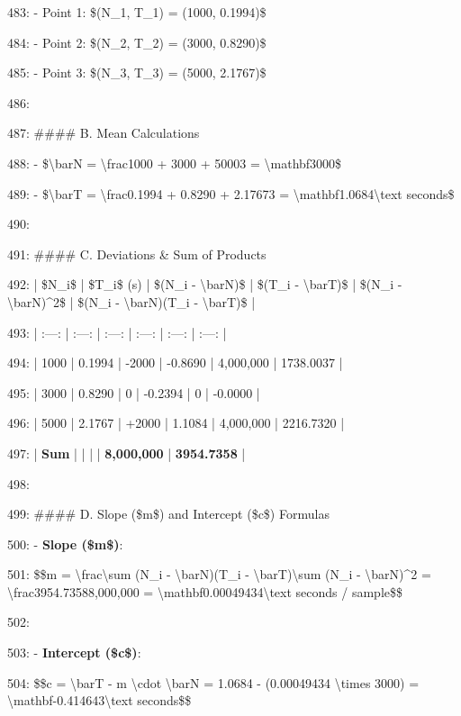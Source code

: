 \documentclass[11pt,a4paper]{article}
\begin{document}
483: - Point 1: \$(N\_1, T\_1) = (1000, 0.1994)\$

484: - Point 2: \$(N\_2, T\_2) = (3000, 0.8290)\$

485: - Point 3: \$(N\_3, T\_3) = (5000, 2.1767)\$

486:

487: \#\#\#\# B. Mean Calculations

488: - \$\textbackslash{}bar{N} = \textbackslash{}frac{1000 + 3000 + 5000}{3} = \textbackslash{}mathbf{3000}\$

489: - \$\textbackslash{}bar{T} = \textbackslash{}frac{0.1994 + 0.8290 + 2.1767}{3} = \textbackslash{}mathbf{1.0684\textbackslash{}text{ seconds}}\$

490:

491: \#\#\#\# C. Deviations \& Sum of Products

492: | \$N\_i\$ | \$T\_i\$ (s) | \$(N\_i - \textbackslash{}bar{N})\$ | \$(T\_i - \textbackslash{}bar{T})\$ | \$(N\_i - \textbackslash{}bar{N})\textasciicircum{}2\$ | \$(N\_i - \textbackslash{}bar{N})(T\_i - \textbackslash{}bar{T})\$ |

493: | :---: | :---: | :---: | :---: | :---: | :---: |

494: | 1000 | 0.1994 | -2000 | -0.8690 | 4,000,000 | 1738.0037 |

495: | 3000 | 0.8290 | 0 | -0.2394 | 0 | -0.0000 |

496: | 5000 | 2.1767 | +2000 | 1.1084 | 4,000,000 | 2216.7320 |

497: | \textbf{Sum} | | | | \textbf{8,000,000} | \textbf{3954.7358} |

498:

499: \#\#\#\# D. Slope (\$m\$) and Intercept (\$c\$) Formulas

500: - \textbf{Slope (\$m\$)}:

501:   \$\$m = \textbackslash{}frac{\textbackslash{}sum (N\_i - \textbackslash{}bar{N})(T\_i - \textbackslash{}bar{T})}{\textbackslash{}sum (N\_i - \textbackslash{}bar{N})\textasciicircum{}2} = \textbackslash{}frac{3954.7358}{8,000,000} = \textbackslash{}mathbf{0.00049434\textbackslash{}text{ seconds / sample}}\$\$

502:

503: - \textbf{Intercept (\$c\$)}:

504:   \$\$c = \textbackslash{}bar{T} - m \textbackslash{}cdot \textbackslash{}bar{N} = 1.0684 - (0.00049434 \textbackslash{}times 3000) = \textbackslash{}mathbf{-0.414643\textbackslash{}text{ seconds}}\$\$
\end{document}
